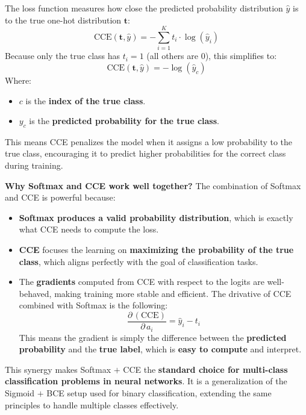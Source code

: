 \highspace
The  loss function measures how close the predicted probability distribution $\hat{y}$ is to the true one-hot distribution $\mathbf{t}$:
\begin{equation}\label{eq:cce-loss}
    \text{CCE}(\mathbf{t}, \hat{y}) = - \sum_{i=1}^{K} t_{i} \cdot \log(\hat{y}_{i})
\end{equation}
Because only the true class has $t_{i} = 1$ (all others are 0), this simplifies to:
\begin{equation}
    \text{CCE}(\mathbf{t}, \hat{y}) = - \log(\hat{y}_{c})
\end{equation}
Where:
\begin{itemize}
    \item $c$ is the \textbf{index of the true class}.
    \item $y_{c}$ is the \textbf{predicted probability for the true class}.
\end{itemize}
This means CCE penalizes the model when it assigns a low probability to the true class, encouraging it to predict higher probabilities for the correct class during training.

\highspace
\textcolor{Green3}{ \textbf{Why Softmax and CCE work well together?}} The combination of Softmax and CCE is powerful because:
\begin{itemize}
    \item[\textcolor{Green3}{\faIcon{check}}] \textbf{Softmax produces a valid probability distribution}, which is exactly what CCE needs to compute the loss.
    \item[\textcolor{Green3}{\faIcon{check}}] \textbf{CCE} focuses the learning on \textbf{maximizing the probability of the true class}, which aligns perfectly with the goal of classification tasks.
    \item[\textcolor{Green3}{\faIcon{check}}] The \textbf{gradients} computed from CCE with respect to the logits are well-behaved, making training more stable and efficient. The drivative of CCE combined with Softmax is the following:
    \begin{equation}
        \dfrac{\partial \, \left(\text{CCE}\right)}{\partial \, a_{i}} = \hat{y}_{i} - t_{i}
    \end{equation}
    This means the gradient is simply the difference between the \textbf{predicted probability} and the \textbf{true label}, which is \textbf{easy to compute} and interpret.
\end{itemize}
This synergy makes Softmax $+$ CCE the \textbf{standard choice for multi-class classification problems in neural networks}. It is a generalization of the Sigmoid $+$ BCE setup used for binary classification, extending the same principles to handle multiple classes effectively.